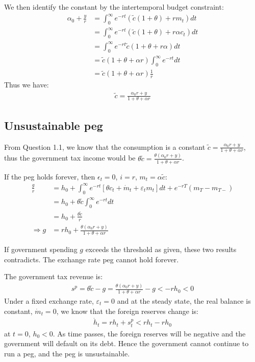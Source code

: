 \documentclass[a4paper,12pt]{article} %
\theoremstyle{nonitalic}
\begin{document}
We then identify the constant by the intertemporal budget constraint:
\begin{align*}
    \alpha_0 + \frac{y}{r} &= \int _0^{\infty} e^{-rt} \left(\tilde{c}(1+\theta) + r m_t \right) dt \\
    &= \int _0^{\infty} e^{-rt} \left(\tilde{c}(1+\theta) + r \alpha c_t \right) dt \\
    &= \int _0^{\infty} e^{-rt} \tilde{c}(1+\theta + r \alpha) dt \\
    &= \tilde{c} (1+\theta +\alpha r) \int _0^{\infty} e^{-rt} dt \\
    &= \tilde{c} (1+\theta +\alpha r) \frac{1}{r}
\end{align*}
Thus we have:
\begin{gather*}
    \tilde{c} = \frac{\alpha_0 r + y}{1 + \theta + \alpha r}
\end{gather*}



\subsection{Unsustainable peg}\label{sec:1.2}

From Question 1.1, we know that the consumption is a constant $\tilde{c} = \frac{\alpha_0 r + y}{1 + \theta + \alpha r}$,
thus the government tax income would be $\theta \tilde{c} = \frac{\theta (\alpha_0 r + y)}{1 + \theta + \alpha r} $.

If the peg holds forever, then $\epsilon_t = 0$, $i = r$, $m_t = \alpha \tilde{c}$:
\begin{align*}
    \frac{g}{r} &= h_0+\int_0^\infty e^{-rt}\left[\theta c_t+\dot{m}_t+\varepsilon_tm_t\right]dt+e^{-rT}(m_T-m_{T-}) \\
    &= h_0+\theta\tilde{c}\int_0^\infty e^{-rt}dt \\
    &= h_0+\frac{\theta\tilde{c}}{r} \\
    \Rightarrow g &= r h_0 + \frac{\theta (\alpha_0 r + y)}{1 + \theta + \alpha r}
\end{align*}

If government spending $g$ exceeds the threshold as given, these two results contradicts.
The exchange rate peg cannot hold forever.

The government tax revenue is:
\begin{gather*}
    s^p = \theta \tilde{c} - g = \frac{\theta (\alpha_0 r + y)}{1 + \theta + \alpha r} - g < -r h_0 < 0
\end{gather*}
Under a fixed exchange rate, $\varepsilon_t = 0$ and at the steady state, the real balance is constant, $\dot{m}_t = 0$,
we know that the foreign reserves change is:
\begin{gather*}
    \dot{h}_t = r h_t + s_t^p < r h_t - r h_0
\end{gather*}
at $t=0$, $h_0 < 0$. As time passes, the foreign reserves will be negative and the government will default on its debt.
Hence the government cannot continue to run a peg, and the peg is unsustainable.
\end{document}
